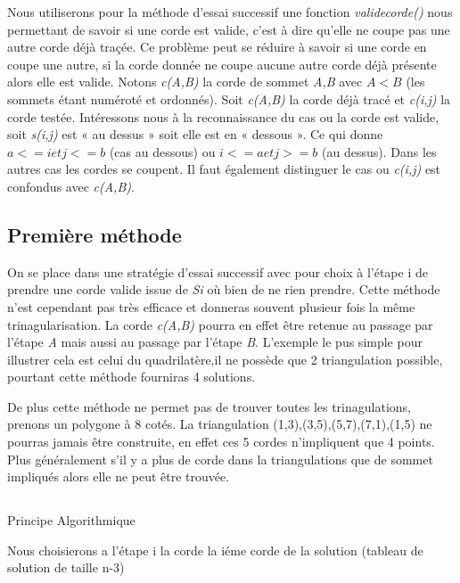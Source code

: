 \documentclass[a4paper,10pt]{article}
\begin{document}
Nous utiliserons pour la méthode d'essai successif une fonction \emph{validecorde()} nous permettant de savoir si une corde est valide, c'est à dire qu'elle ne coupe pas une autre corde déjà traçée.
Ce problème peut se réduire à savoir si une corde en coupe une autre, si la corde donnée ne coupe aucune autre corde déjà présente alors elle est valide.
Notons \emph{c(A,B)} la corde de sommet \emph{A,B} avec $A<B$ (les sommets étant numéroté et ordonnés).
Soit \emph{c(A,B)} la corde déjà tracé et \emph{c(i,j)} la corde testée.
Intéressons nous à la reconnaissance du cas ou la corde est valide, soit \emph{s(i,j)} est « au dessus » soit elle est en « dessous ».
Ce qui donne $a<=i et j<=b$ (cas au dessous) ou $i<=a et j>=b$ (au dessus).
Dans les autres cas les cordes se coupent.
Il faut également distinguer le cas ou \emph{c(i,j)} est confondus avec \emph{c(A,B)}.
 

\subsection{Première méthode}

On se place dans une stratégie d'essai successif avec pour choix à l'étape i de prendre une corde valide issue de \emph{Si} où bien de ne rien prendre.
Cette méthode n'est cependant pas très efficace et donneras souvent plusieur fois la même trinagularisation.
La corde \emph{c(A,B)} pourra en effet être retenue au passage par l'étape \emph{A} mais aussi au passage par l'étape \emph{B}.
L'exemple le pus simple pour illustrer cela est celui du quadrilatère,il ne possède que 2 triangulation possible, pourtant cette méthode fourniras 4 solutions.

De plus cette méthode ne permet pas de trouver toutes les trinagulations, prenons un polygone à 8 cotés.
La triangulation (1,3),(3,5),(5,7),(7,1),(1,5) ne pourras jamais être construite, en effet ces 5 cordes n'impliquent que 4 points.
Plus généralement s'il y a plus de corde dans la triangulations que de sommet impliqués alors elle ne peut être trouvée.


\subsection{}
 
Principe Algorithmique

 

Nous choisierons a l'étape i la corde la iéme corde de la solution (tableau de solution de taille n-3)
\end{document}

